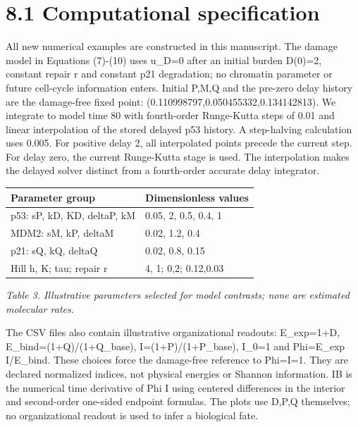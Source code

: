 \documentclass[11pt,a4paper]{article}
\begin{document}
\section*{8.1 Computational specification}
All new numerical examples are constructed in this manuscript. The damage model in Equations (7)-(10) uses u\_D=0 after an initial burden D(0)=2, constant repair r and constant p21 degradation; no chromatin parameter or future cell-cycle information enters. Initial P,M,Q and the pre-zero delay history are the damage-free fixed point: (0.110998797,0.050455332,0.134142813). We integrate to model time 80 with fourth-order Runge-Kutta steps of 0.01 and linear interpolation of the stored delayed p53 history. A step-halving calculation uses 0.005. For positive delay 2, all interpolated points precede the current step. For delay zero, the current Runge-Kutta stage is used. The interpolation makes the delayed solver distinct from a fourth-order accurate delay integrator.

\begin{longtable}{p{7.9cm}|p{7.9cm}}
Parameter group & Dimensionless values\\\hline
p53: sP, kD, KD, deltaP, kM & 0.05, 2, 0.5, 0.4, 1\\\hline
MDM2: sM, kP, deltaM & 0.02, 1.2, 0.4\\\hline
p21: sQ, kQ, deltaQ & 0.02, 0.8, 0.15\\\hline
Hill h, K; tau; repair r & 4, 1; {0,2}; {0.12,0.03}\\\hline
\end{longtable}{\small\itshape Table 3. Illustrative parameters selected for model contrasts; none are estimated molecular rates.\par}
The CSV files also contain illustrative organizational readouts: E\_exp=1+D, E\_bind=(1+Q)/(1+Q\_base), I=(1+P)/(1+P\_base), I\_0=1 and Phi=E\_exp I/E\_bind. These choices force the damage-free reference to Phi=I=1. They are declared normalized indices, not physical energies or Shannon information. IB is the numerical time derivative of Phi I using centered differences in the interior and second-order one-sided endpoint formulas. The plots use D,P,Q themselves; no organizational readout is used to infer a biological fate.
\end{document}
